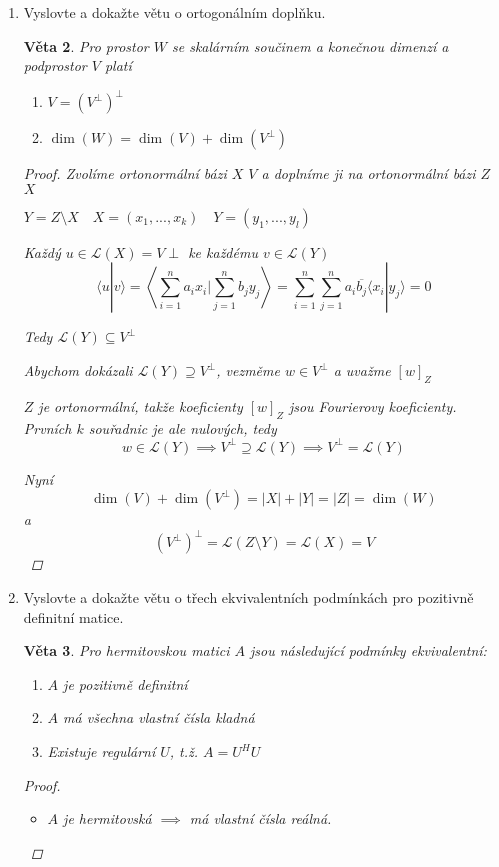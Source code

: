 \documentclass[10pt,a4paper]{article}
\theoremstyle{plain}
\newtheorem{veta}{Věta}
\begin{document}
\begin{enumerate}
\begin{veta}
\begin{proof}
Tedy \[ [w]_X^H[u]_X = [w]^H_X[f]^H_{XY}[f]_{XY}[u]_X\]
\[[f]^H_{XY} =[f]^{-1}_{XY}\]

$[f]_{XY}$ je unitární.

\end{proof}
\end{veta}

\item Vyslovte a dokažte větu o ortogonálním doplňku.

\begin{veta}
Pro prostor $W$ se skalárním součinem a konečnou dimenzí a podprostor $V$ platí \begin{enumerate}[label=(\alph*)]
\item $V = (V^\perp)^\perp$
\item $\dim(W) = \dim(V) + \dim(V^\perp)$
\end{enumerate}
\begin{proof}
Zvolíme ortonormální bázi $X$ $V$ a doplníme ji na ortonormální bázi $Z$ $X$

$Y = Z \setminus X \quad X = (x_1, ..., x_k) \quad Y = (y_1, ..., y_l)$

Každý $u \in \mathcal{L}(X) = V \perp$ ke každému $v \in \mathcal{L}(Y)$
\[ \langle u|v \rangle = \left\langle \sum^n_{i=1} a_ix_i | \sum^n_{j=1} b_jy_j \right\rangle =  \sum^n_{i=1}  \sum^n_{j=1} a_i \overline{b_j} \langle x_i | y_j \rangle = 0 \]

Tedy $ \mathcal{L}(Y) \subseteq V^\perp$

Abychom dokázali $ \mathcal{L}(Y) \supseteq V^\perp$, vezměme $w \in V^\perp$ a uvažme $[w]_Z$

$Z$ je ortonormální, takže koeficienty $[w]_Z$ jsou Fourierovy koeficienty. Prvních $k$ souřadnic je ale nulových, tedy \[w \in \mathcal{L}(Y) \implies V^\perp \supseteq \mathcal{L}(Y) \implies V^\perp = \mathcal{L}(Y)\]

\hfill

Nyní \[ \dim(V) + \dim(V^\perp) = |X| + |Y| = |Z| = \dim(W) \]
a \[(V^\perp)^\perp =  \mathcal{L}(Z \setminus Y) =  \mathcal{L}(X) = V  \]
\end{proof}
\end{veta}

\item Vyslovte a dokažte větu o třech ekvivalentních podmínkách pro pozitivně definitní matice.

\begin{veta}
Pro hermitovskou matici $A$ jsou následující podmínky ekvivalentní:
\begin{enumerate}
\item $A$ je pozitivně definitní
\item $A$ má všechna vlastní čísla kladná
\item Existuje regulární $U$, t.ž. $A = U^HU$
\end{enumerate}
\begin{proof}$\ $
\begin{itemize}
\item[$1 \implies 2$] 
$A$ je hermitovská $\implies$ má vlastní čísla reálná.


\end{itemize}
\end{proof}
\end{veta}
\end{enumerate}
\end{document}

